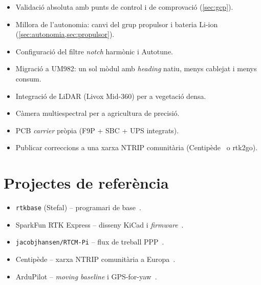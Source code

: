 \begin{itemize}
    \item Validació absoluta amb punts de control i de comprovació (\cref{sec:gcp}).
    \item Millora de l'autonomia: canvi del grup propulsor i bateria Li-ion (\cref{sec:autonomia,sec:propulsor}).
    \item Configuració del filtre \emph{notch} harmònic i Autotune.
    \item Migració a UM982: un sol mòdul amb \emph{heading} natiu, menys cablejat i menys consum.
    \item Integració de LiDAR (Livox Mid-360) per a vegetació densa.
    \item Càmera multiespectral per a agricultura de precisió.
    \item PCB \emph{carrier} pròpia (F9P + SBC + UPS integrats).
    \item Publicar correccions a una xarxa NTRIP comunitària (Centipède~\cite{centipede} o rtk2go).
\end{itemize}

\section{Projectes de referència}
\label{sec:referencies}

\begin{itemize}
    \item \texttt{rtkbase} (Stefal) -- programari de base~\cite{rtkbase}.
    \item SparkFun RTK Express -- disseny KiCad i \emph{firmware}~\cite{sparkfun_rtk_express}.
    \item \texttt{jacobjhansen/RTCM-Pi} -- flux de treball PPP~\cite{rtcm_pi}.
    \item Centipède -- xarxa NTRIP comunitària a Europa~\cite{centipede}.
    \item ArduPilot -- \emph{moving baseline} i GPS-for-yaw~\cite{ardupilot_moving_baseline}.
\end{itemize}

